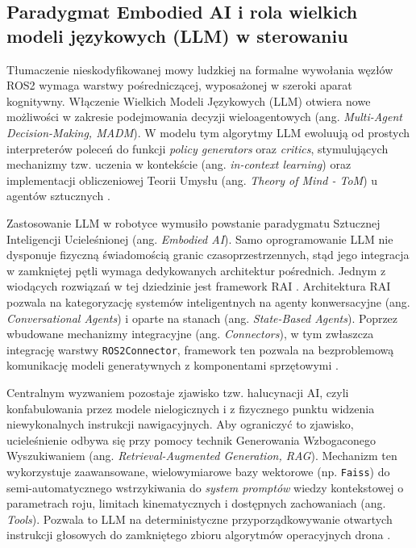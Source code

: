 \subsection{Paradygmat Embodied AI i rola wielkich modeli językowych (LLM) w sterowaniu}
Tłumaczenie nieskodyfikowanej mowy ludzkiej na formalne wywołania węzłów ROS2 wymaga warstwy pośredniczącej, wyposażonej w szeroki aparat kognitywny. Włączenie Wielkich Modeli Językowych (LLM) otwiera nowe możliwości w zakresie podejmowania decyzji wieloagentowych (ang. \textit{Multi-Agent Decision-Making, MADM}). W modelu tym algorytmy LLM ewoluują od prostych interpreterów poleceń do funkcji \textit{policy generators} oraz \textit{critics}, stymulujących mechanizmy tzw. uczenia w kontekście (ang. \textit{in-context learning}) oraz implementacji obliczeniowej Teorii Umysłu (ang. \textit{Theory of Mind - ToM}) u agentów sztucznych \cite{sun2025}.

Zastosowanie LLM w robotyce wymusiło powstanie paradygmatu Sztucznej Inteligencji Ucieleśnionej (ang. \textit{Embodied AI}). Samo oprogramowanie LLM nie dysponuje fizyczną świadomością granic czasoprzestrzennych, stąd jego integracja w zamkniętej pętli wymaga dedykowanych architektur pośrednich. Jednym z wiodących rozwiązań w tej dziedzinie jest framework RAI \cite{rachwal2025}. Architektura RAI pozwala na kategoryzację systemów inteligentnych na agenty konwersacyjne (ang. \textit{Conversational Agents}) i oparte na stanach (ang. \textit{State-Based Agents}). Poprzez wbudowane mechanizmy integracyjne (ang. \textit{Connectors}), w tym zwłaszcza integrację warstwy \texttt{ROS2Connector}, framework ten pozwala na bezproblemową komunikację modeli generatywnych z komponentami sprzętowymi \cite{rachwal2025}.

Centralnym wyzwaniem pozostaje zjawisko tzw. halucynacji AI, czyli konfabulowania przez modele nielogicznych i z fizycznego punktu widzenia niewykonalnych instrukcji nawigacyjnych. Aby ograniczyć to zjawisko, ucieleśnienie odbywa się przy pomocy technik Generowania Wzbogaconego Wyszukiwaniem (ang. \textit{Retrieval-Augmented Generation, RAG}). Mechanizm ten wykorzystuje zaawansowane, wielowymiarowe bazy wektorowe (np. \texttt{Faiss}) do semi-automatycznego wstrzykiwania do \textit{system promptów} wiedzy kontekstowej o parametrach roju, limitach kinematycznych i dostępnych zachowaniach (ang. \textit{Tools}). Pozwala to LLM na deterministyczne przyporządkowywanie otwartych instrukcji głosowych do zamkniętego zbioru algorytmów operacyjnych drona \cite{rachwal2025}.

